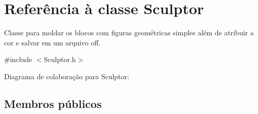 \hypertarget{class_sculptor}{}\section{Referência à classe Sculptor}
\label{class_sculptor}


Classe para moldar os blocos com figuras geométricas simples além de atribuir a cor e salvar em um arquivo off.  




{\ttfamily \#include $<$Sculptor.\+h$>$}



Diagrama de colaboração para Sculptor\+:
\subsection*{Membros públicos}
